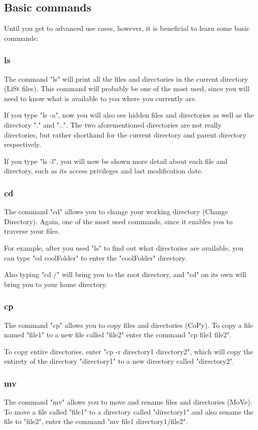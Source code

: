 \documentclass[12pt,article]{memoir}
\begin{document}
\subsection{Basic commands}
Until you get to advanced use cases, however, it is beneficial to learn some basic commands:

\subsubsection{ls}
The command "ls" will print all the files and directories in the current directory (LiSt files). This command will probably be one of the most used, since you will need to know what is available to you where you currently are.\par
If you type "ls -a", now you will also see hidden files and directories as well as the directory "." and "..". The two aforementioned directories are not really directories, but rather shorthand for the current directory and parent directory respectively.\par
If you type "ls -l", you will now be shown more detail about each file and directory, such as its access privileges and last modification date.

\subsubsection{cd}
The command "cd" allows you to change your working directory (Change Directory). Again, one of the most used commands, since it enables you to traverse your files.\par
For example, after you used "ls" to find out what directories are available, you can type "cd coolFolder" to enter the "coolFolder" directory.\par
Also typing "cd /" will bring you to the root directory, and "cd" on its own will bring you to your home directory.

\subsubsection{cp}
The command "cp" allows you to copy files and directories (CoPy). To copy a file named "file1" to a new file called "file2" enter the command "cp file1 file2".\par
To copy entire directories, enter "cp -r directory1 directory2", which will copy the entirety of the directory "directory1" to a new directory called "directory2".

\newpage
\subsubsection{mv}
The command "mv" allows you to move and rename files and directories (MoVe). To move a file called "file1" to a directory called "directory1" and also rename the file to "file2", enter the command "mv file1 directory1/file2".
\end{document}
